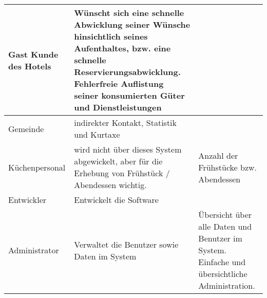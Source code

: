 \begin{longtable}{|p{3.5cm}|p{5cm}|p{6cm}|}
    Gast
    Kunde des Hotels &
    Wünscht sich eine schnelle Abwicklung seiner Wünsche hinsichtlich seines Aufenthaltes, bzw. eine schnelle Reservierungsabwicklung.
    Fehlerfreie Auflistung seiner konsumierten Güter und Dienstleistungen &
    \\       \hline

    Gemeinde &
    indirekter Kontakt, Statistik und Kurtaxe &

    \\       \hline

    Küchenpersonal &
    wird nicht über dieses System abgewickelt, aber für die Erhebung von Frühstück / Abendessen wichtig. &
    Anzahl der Frühstücke bzw. Abendessen
    \\       \hline

    Entwickler &
    Entwickelt die Software &
    \\       \hline

    Administrator &
    Verwaltet die Benutzer sowie Daten im System &
    Übersicht über alle Daten und Benutzer im System. Einfache und übersichtliche Administration.
    \\         \hline
\end{longtable}